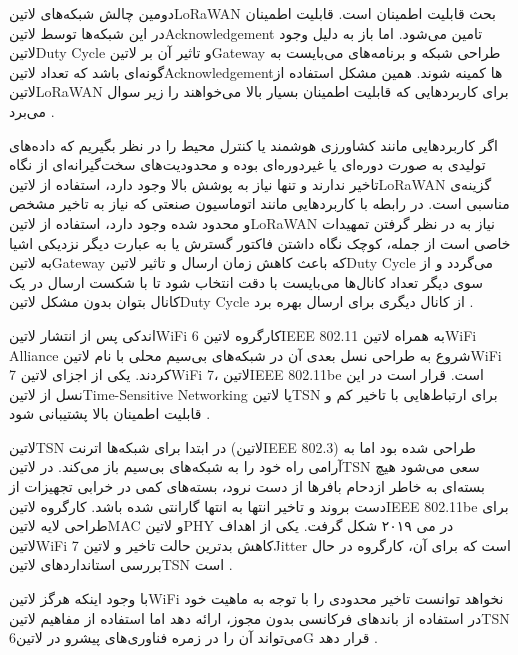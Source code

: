 دومین چالش شبکه‌های ‌لاتین{LoRaWAN} بحث قابلیت اطمینان است. قابلیت اطمینان در این شبکه‌ها توسط ‌لاتین{Acknowledgement} تامین می‌شود.
اما باز به دلیل وجود ‌لاتین{Duty Cycle} و تاثیر آن بر ‌لاتین{Gateway} طراحی شبکه و برنامه‌های می‌بایست به گونه‌ای باشد که تعداد ‌لاتین{Acknowledgement}ها کمینه شوند.
همین مشکل استفاده از ‌لاتین{LoRaWAN} برای کاربردهایی که قابلیت اطمینان بسیار بالا می‌خواهند را زیر سوال می‌برد
.

اگر کاربردهایی مانند کشاورزی هوشمند یا کنترل محیط را در نظر بگیریم که داده‌های تولیدی به صورت دوره‌ای یا غیردوره‌ای بوده و محدودیت‌های سخت‌گیرانه‌ای از نگاه تاخیر ندارند و تنها نیاز به پوشش بالا وجود دارد،
استفاده از ‌لاتین{LoRaWAN} گزینه‌ی مناسبی است. در رابطه با کاربردهایی مانند اتوماسیون صنعتی که نیاز به تاخیر مشخص و محدود شده وجود دارد، استفاده از ‌لاتین{LoRaWAN} نیاز به در نظر گرفتن تمهیدات
خاصی است از جمله، کوچک نگاه داشتن فاکتور گسترش یا به عبارت دیگر نزدیکی اشیا به ‌لاتین{Gateway} که باعث کاهش زمان ارسال و تاثیر ‌لاتین{Duty Cycle} می‌گردد و از سوی دیگر تعداد کانال‌ها می‌بایست
با دقت انتخاب شود تا با شکست ارسال در یک کانال بتوان بدون مشکل ‌لاتین{Duty Cycle} از کانال دیگری برای ارسال بهره برد
.


اندکی پس از انتشار ‌لاتین{WiFi 6} کارگروه ‌لاتین{IEEE 802.11} به همراه ‌لاتین{WiFi Alliance} شروع به طراحی نسل بعدی آن در شبکه‌های بی‌سیم محلی با نام ‌لاتین{WiFi 7} کردند.
یکی از اجزای ‌لاتین{WiFi 7}، ‌لاتین{IEEE 802.11be} است. قرار است در این نسل از ‌لاتین{Time-Sensitive Networking} یا ‌لاتین{TSN} برای ارتباط‌هایی با تاخیر کم و قابلیت
اطمینان بالا پشتیبانی شود
.

‌لاتین{TSN} در ابتدا برای شبکه‌ها اترنت (‌لاتین{IEEE 802.3}) طراحی شده بود اما به آرامی راه خود را به شبکه‌های بی‌سیم باز می‌کند. در ‌لاتین{TSN} سعی می‌شود
هیچ بسته‌ای به خاطر ازدحام بافرها از دست نرود، بسته‌های کمی در خرابی تجهیزات از دست بروند و تاخیر انتها به انتها گارانتی شده باشد.
کارگروه ‌لاتین{IEEE 802.11be} برای طراحی لایه ‌لاتین{MAC} و ‌لاتین{PHY} در می ۲۰۱۹ شکل گرفت. یکی از اهداف ‌لاتین{WiFi 7} کاهش بدترین حالت تاخیر و ‌لاتین{Jitter} است
که برای آن، کارگروه در حال بررسی استانداردهای ‌لاتین{TSN} است
.

با وجود اینکه هرگز ‌لاتین{WiFi} نخواهد توانست تاخیر محدودی را با توجه به ماهیت خود در استفاده از باندهای فرکانسی بدون مجوز، ارائه دهد اما استفاده از مفاهیم ‌لاتین{TSN}
می‌تواند آن را در زمره فناوری‌های پیشرو در ‌لاتین{6G} قرار دهد
.

